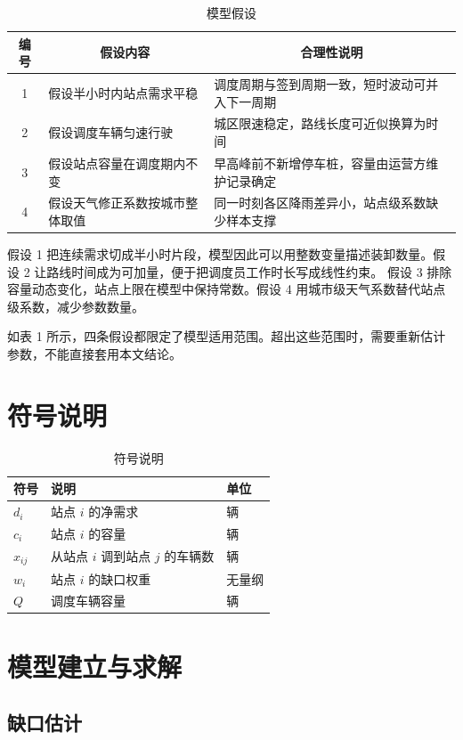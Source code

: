 \documentclass[12pt,a4paper]{article}
\begin{document}
\begin{table}[H]
\centering
\caption{模型假设}
\label{tab:assumptions}
\begin{tabularx}{\textwidth}{c X X}
\toprule
编号 & \multicolumn{1}{c}{假设内容} & \multicolumn{1}{c}{合理性说明} \\
\midrule
1 & 假设半小时内站点需求平稳 & 调度周期与签到周期一致，短时波动可并入下一周期 \\
2 & 假设调度车辆匀速行驶 & 城区限速稳定，路线长度可近似换算为时间 \\
3 & 假设站点容量在调度期内不变 & 早高峰前不新增停车桩，容量由运营方维护记录确定 \\
4 & 假设天气修正系数按城市整体取值 & 同一时刻各区降雨差异小，站点级系数缺少样本支撑 \\
\bottomrule
\end{tabularx}
\end{table}

假设 1 把连续需求切成半小时片段，模型因此可以用整数变量描述装卸数量。假设 2 让路线时间成为可加量，便于把调度员工作时长写成线性约束。
假设 3 排除容量动态变化，站点上限在模型中保持常数。假设 4 用城市级天气系数替代站点级系数，减少参数数量。

如表 1 所示，四条假设都限定了模型适用范围。超出这些范围时，需要重新估计参数，不能直接套用本文结论。

\section{符号说明}

\begin{table}[H]
\centering
\caption{符号说明}
\begin{tabular}{lll}
\toprule
符号 & 说明 & 单位 \\
\midrule
$d_i$ & 站点 $i$ 的净需求 & 辆 \\
$c_i$ & 站点 $i$ 的容量 & 辆 \\
$x_{ij}$ & 从站点 $i$ 调到站点 $j$ 的车辆数 & 辆 \\
$w_i$ & 站点 $i$ 的缺口权重 & 无量纲 \\
$Q$ & 调度车辆容量 & 辆 \\
\bottomrule
\end{tabular}
\end{table}

\section{模型建立与求解}

\subsection{缺口估计}
\end{document}
